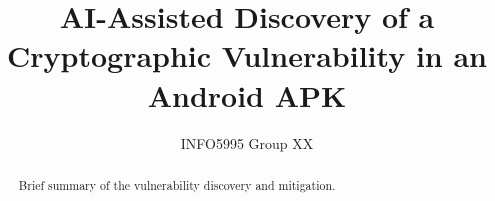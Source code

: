 \documentclass[letterpaper,twocolumn,10pt]{article}
\title{AI-Assisted Discovery of a Cryptographic Vulnerability in an Android APK}
\author{INFO5995 Group XX}
\begin{document}
\maketitle

\begin{abstract}
Brief summary of the vulnerability discovery and mitigation.
\end{abstract}









\end{document}

